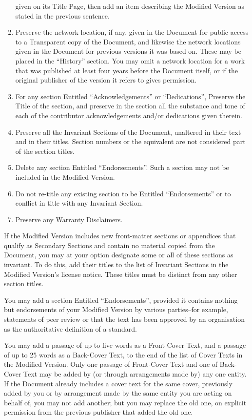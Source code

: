 \documentclass[10pt,a4paper,titlepage,twoside,openright]{report}
\begin{document}
\begin{enumerate}
   given on its Title Page, then add an item describing the Modified
   Version as stated in the previous sentence.
\item Preserve the network location, if any, given in the Document for
   public access to a Transparent copy of the Document, and likewise
   the network locations given in the Document for previous versions
   it was based on.  These may be placed in the ``History'' section.
   You may omit a network location for a work that was published at
   least four years before the Document itself, or if the original
   publisher of the version it refers to gives permission.
\item For any section Entitled ``Acknowledgements'' or ``Dedications'',
   Preserve the Title of the section, and preserve in the section all
   the substance and tone of each of the contributor acknowledgements
   and/or dedications given therein.
\item Preserve all the Invariant Sections of the Document,
   unaltered in their text and in their titles.  Section numbers
   or the equivalent are not considered part of the section titles.
\item Delete any section Entitled ``Endorsements''.  Such a section
   may not be included in the Modified Version.
\item Do not re-title any existing section to be Entitled ``Endorsements''
   or to conflict in title with any Invariant Section.
\item Preserve any Warranty Disclaimers.
\end{enumerate}

If the Modified Version includes new front-matter sections or
appendices that qualify as Secondary Sections and contain no material
copied from the Document, you may at your option designate some or all
of these sections as invariant.  To do this, add their titles to the
list of Invariant Sections in the Modified Version's license notice.
These titles must be distinct from any other section titles.

You may add a section Entitled ``Endorsements'', provided it contains
nothing but endorsements of your Modified Version by various
parties--for example, statements of peer review or that the text has
been approved by an organisation as the authoritative definition of a
standard.

You may add a passage of up to five words as a Front-Cover Text, and a
passage of up to 25 words as a Back-Cover Text, to the end of the list
of Cover Texts in the Modified Version.  Only one passage of
Front-Cover Text and one of Back-Cover Text may be added by (or
through arrangements made by) any one entity.  If the Document already
includes a cover text for the same cover, previously added by you or
by arrangement made by the same entity you are acting on behalf of,
you may not add another; but you may replace the old one, on explicit
permission from the previous publisher that added the old one.
\end{document}
